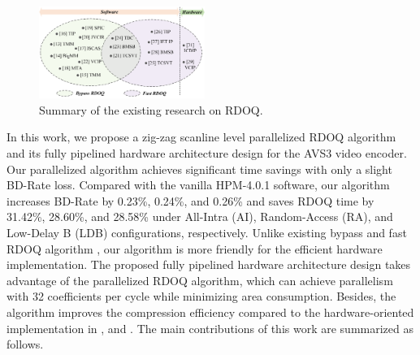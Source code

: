 \documentclass[lettersize,journal]{IEEEtran}
\begin{document}
\begin{figure}[!h]
	\centering
	\centerline{\includegraphics[width=0.48\textwidth]{figure/Summary_rdoq.png}} 
	\caption{Summary of the existing research on RDOQ.}
	\label{summary} %
\end{figure}
\par
In this work, we propose a zig-zag scanline level parallelized RDOQ algorithm and its fully pipelined hardware architecture design for the AVS3 video encoder. Our parallelized algorithm achieves significant time savings with only a slight BD-Rate loss. Compared with the vanilla HPM-4.0.1 software, our algorithm increases BD-Rate by 0.23\%, 0.24\%, and 0.26\% and saves RDOQ time by 31.42\%, 28.60\%, and 28.58\% under All-Intra (AI), Random-Access (RA), and Low-Delay B (LDB) configurations, respectively. Unlike existing bypass and fast RDOQ algorithm \cite{lee2016all-zero, wang2017fastrdoq, fan2016hybridzreoblock, cui2018hybrid, cui2017adaptive, wei2019all, yin2018efficient, yin2020multistageallzerodetection, lee2015fastquantizationmethod, zhang2015fastrdoq, xu2018simplifiedrdoq, xu2020simplifiedLevelEstimation, huang2015efficientquantization, cui2017Laplacedistributionbased, he2015highimplementationrdoq, wang2016improvedrdoq, canh2018rate, kianfar2020parallelized}, our algorithm is more friendly for the efficient hardware implementation. 
The proposed fully pipelined hardware architecture design takes advantage of the parallelized RDOQ algorithm, which can achieve parallelism with 32 coefficients per cycle while minimizing area consumption. Besides, the algorithm improves the compression efficiency compared to the hardware-oriented implementation in \cite{igarashi2018parallelGPU, xu2022hardwarefriendlyforrdoq}, and \cite{zhao2023scanline}. The main contributions of this work are summarized as follows. 
\end{document}
